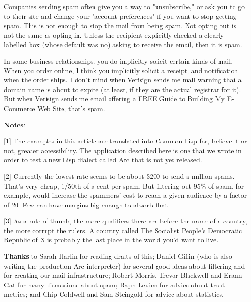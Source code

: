 Companies
                    sending spam often give you a way to "unsubscribe," or ask
                    you to go to their site and change your "account
                    preferences" if you want to stop getting spam. This is not
                    enough to stop the mail from being spam. Not opting out is
                    not the same as opting in. Unless the recipient explicitly
                    checked a clearly labelled box (whose default was no) asking
                    to receive the email, then it is spam.

In some
                    business relationships, you do implicitly solicit certain
                    kinds of mail. When you order online, I think you implicitly
                    solicit a receipt, and notification when the order ships. I
                    don't mind when Verisign sends me mail warning that a domain
                    name is about to expire (at least, if they are the
                    \href{http://siliconvalley.internet.com/news/article.php/1441651}{actual registrar}
                    for it). But when Verisign sends me email offering a FREE
                    Guide to Building My E-Commerce Web Site, that's spam.


                    \textbf{Notes:}

[1] The examples in this article
                    are translated into Common Lisp for, believe it or not,
                    greater accessibility. The application described here is one
                    that we wrote in order to test a new Lisp dialect called
                    \href{http://www.paulgraham.com/arc.html}{Arc} that is not yet released.

[2]
                    Currently the lowest rate seems to be about \$200 to send a
                    million spams. That's very cheap, 1/50th of a cent per spam.
                    But filtering out 95\% of spam, for example, would increase
                    the spammers' cost to reach a given audience by a factor of
                    20. Few can have margins big enough to absorb that.

[3]
                    As a rule of thumb, the more qualifiers there are before the
                    name of a country, the more corrupt the rulers. A country
                    called The Socialist People's Democratic Republic of X is
                    probably the last place in the world you'd want to live.


                    \textbf{Thanks} to Sarah Harlin for reading drafts of this;
                    Daniel Giffin (who is also writing the production Arc
                    interpreter) for several good ideas about filtering and for
                    creating our mail infrastructure; Robert Morris, Trevor
                    Blackwell and Erann Gat for many discussions about spam;
                    Raph Levien for advice about trust metrics; and Chip
                    Coldwell and Sam Steingold for advice about statistics.


